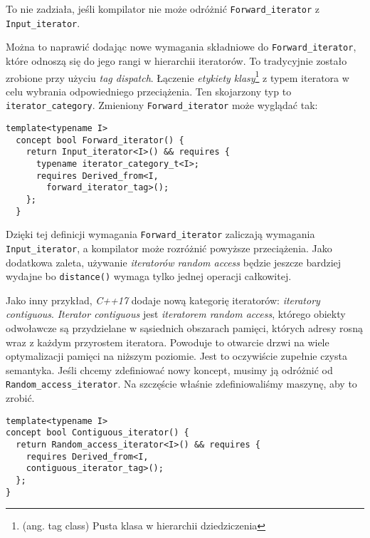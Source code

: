 \documentclass[11pt, a4paper]{article}
\begin{document}
To nie zadziała, jeśli kompilator nie może odróżnić \verb#Forward_iterator# z \verb#Input_iterator#. 

Można to naprawić dodając nowe wymagania składniowe do \verb#Forward_iterator#, które odnoszą się do jego rangi w hierarchii iteratorów. To tradycyjnie zostało zrobione przy użyciu \emph{tag dispatch}. Łączenie \emph{etykiety klasy}\footnote{(ang. tag class) Pusta klasa w hierarchii dziedziczenia} z typem iteratora w celu wybrania odpowiedniego przeciążenia. Ten skojarzony typ to \verb#iterator_category#. Zmieniony \verb#Forward_iterator# może wyglądać tak:

\begin{lstlisting}[frame=single]
template<typename I>
  concept bool Forward_iterator() {
    return Input_iterator<I>() && requires {
      typename iterator_category_t<I>;
      requires Derived_from<I,
        forward_iterator_tag>();
    };
  }
\end{lstlisting}

Dzięki tej definicji wymagania \verb#Forward_iterator# zaliczają wymagania \verb#Input_iterator#, a kompilator może rozróżnić powyższe przeciążenia. Jako dodatkowa zaleta, używanie \emph{iteratorów random access} będzie jeszcze bardziej wydajne bo \verb#distance()# wymaga tylko jednej operacji całkowitej.

Jako inny przykład, \emph{C++17} dodaje nową kategorię iteratorów: \emph{iteratory contiguous}. \emph{Iterator contiguous} jest \emph{iteratorem random access}, którego obiekty odwoławcze są przydzielane w sąsiednich obszarach pamięci, których adresy rosną wraz z każdym przyrostem iteratora. Powoduje to otwarcie drzwi na wiele optymalizacji pamięci na niższym poziomie. Jest to oczywiście zupełnie czysta semantyka. Jeśli chcemy zdefiniować nowy koncept, musimy ją odróżnić od \verb#Random_access_iterator#. Na szczęście właśnie zdefiniowaliśmy maszynę, aby to zrobić.

\begin{lstlisting}[frame=single]
template<typename I>
concept bool Contiguous_iterator() {
  return Random_access_iterator<I>() && requires {
    requires Derived_from<I,
    contiguous_iterator_tag>();
  };
}
\end{lstlisting}

\end{document}
